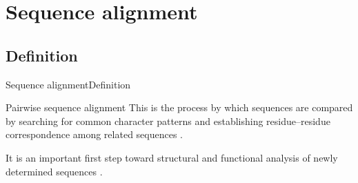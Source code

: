 \documentclass[10pt]{beamer}
\newcommand{\1}{
	\setbeamertemplate{background}{
		\texttt{[image: img/1]}
		\tikz[overlay] \fill[fill opacity=0.75,fill=white] (0,0) rectangle (-\paperwidth,\paperheight);
	}
}
\begin{document}
\section{Sequence alignment}

\subsection{Definition}

\begin{frame}{Sequence alignment}{Definition}

\begin{block}{Pairwise sequence alignment}
\centering
This is the process by which
sequences are compared by searching for common character patterns and establishing residue–residue correspondence among related sequences \cite{xiong2006essential}.
\end{block}

\begin{block}{}
\centering
 It is an important
first step toward structural and functional analysis of newly determined sequences \cite{xiong2006essential}.
\end{block}

\end{frame}
\end{document}
